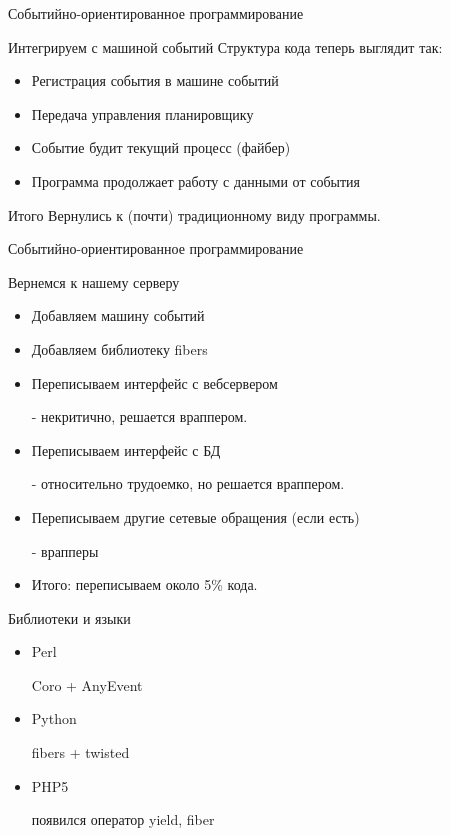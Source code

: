 \documentclass[aspectratio=169]{beamer}
\begin{document}
\begin{frame}{Событийно-ориентированное программирование}
    \begin{block}{Интегрируем с машиной событий}
        Структура кода теперь выглядит так:
        \begin{itemize}
            \pause\item Регистрация события в машине событий
            \pause\item Передача управления планировщику
            \pause\item Событие будит текущий процесс (файбер)
            \pause\item Программа продолжает работу с данными от события
        \end{itemize}
    \end{block}
    \pause
    \begin{block}{Итого}
        Вернулись к (почти) традиционному виду программы.
    \end{block}
\end{frame}

\begin{frame}{Событийно-ориентированное программирование} 
    \begin{block}{Вернемся к нашему серверу}
        \begin{itemize}
            \pause\item Добавляем машину событий
            \pause\item Добавляем библиотеку fibers
            \pause\item Переписываем интерфейс с вебсервером
                \pause\par - некритично, решается враппером.
            \pause\item Переписываем интерфейс с БД
                \pause\par - относительно трудоемко, но решается враппером.
            \pause\item Переписываем другие сетевые обращения (если есть)
                \pause\par - врапперы

            \pause\item Итого: переписываем около 5\% кода.
        \end{itemize}
    \end{block}
\end{frame}

\begin{frame}{Библиотеки и языки}
    \begin{itemize}
        \pause\item Perl
            \pause\par Coro + AnyEvent
        \pause\item Python
            \pause\par fibers + twisted
        \pause\item PHP5
            \pause\par появился оператор yield, fiber
    \end{itemize}
\end{frame}
\end{document}

